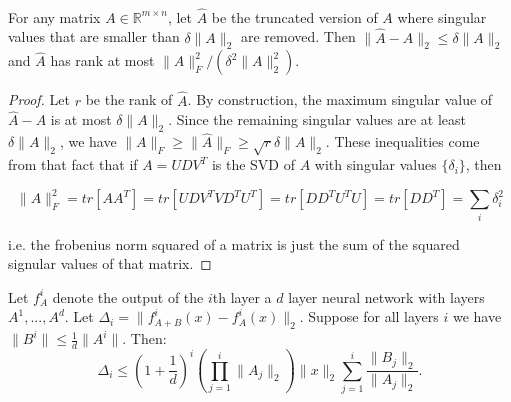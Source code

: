 \

\begin{lemma} For any matrix $A\in \mathbb{R}^{m\times n}$, let $\hat{A}$ be the truncated version of $A$ where singular values that are smaller than $\delta\|A\|_2$ are removed. Then $\|\hat{A}-A\|_2\leq \delta\|A\|_2$ and $\hat{A}$ has rank at most $\|A\|_F^2/(\delta^2\|A\|_2^2)$.
\end{lemma}


\begin{proof}
Let $r$ be the rank of $\hat{A}$. By construction, the maximum singular value of $\hat{A}-A$ is at most $\delta\|A\|_2$. Since the remaining singular values are at least $\delta\|A\|_2$, we have $\|A\|_F \ge \|\hat{A}\|_F \ge \sqrt{r} \delta\|A\|_2$. These inequalities come from that fact that if $A=UDV^{T}$ is the SVD of $A$ with singular values $\{\delta_i\}$, then 

\begin{equation}
\|A\|_{F}^2 = tr[AA^{T}]=tr[UDV^{T}VD^{T}U^{T}]=tr[DD^{T}U^{T}U]=tr[DD^{T}]=\sum_{i} \delta_{i}^2
\end{equation}

i.e. the frobenius norm squared of a matrix is just the sum of the squared signular values of that matrix. 

\end{proof}

\begin{lemma} Let $f^{i}_{A}$ denote the output of the $i$th layer a $d$ layer neural network with layers $A^{1},...,A^{d}$. Let $\Delta_i= \|f^i_{A+B}(x)-f^i_{A}(x)\|_2$. Suppose for all layers $i$ we have $\|B^{i}\|\leq \frac{1}{d}\|A^{i}\|$. Then:
\begin{equation*}
\Delta_i \leq \left(1+\frac{1}{d}\right)^i \left(\prod_{j=1}^i \|A_j\|_2\right)\|x\|_2\sum_{j=1}^i \frac{\|B_j\|_2}{\|A_j\|_2}.
\end{equation*}
\end{lemma}

